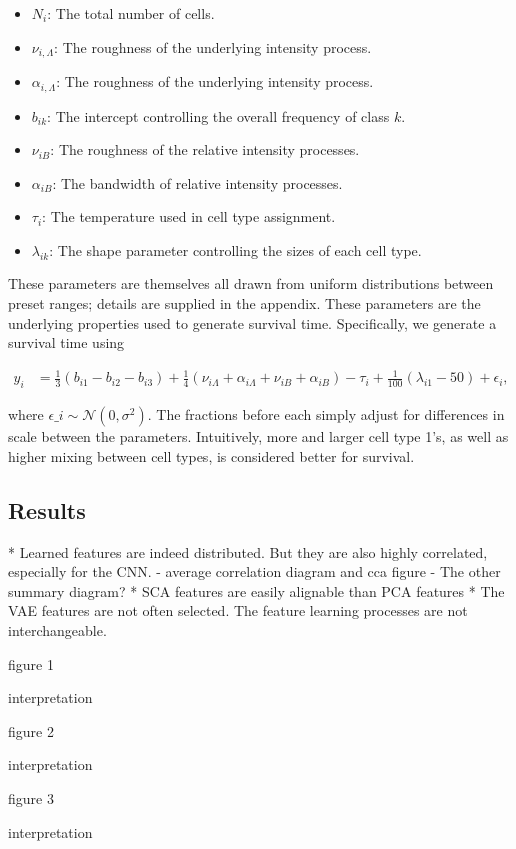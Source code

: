 \begin{itemize}
\item $N_i$: The total number of cells.
\item $\nu_{i,\Lambda}$: The roughness of the underlying intensity process.
\item $\alpha_{i,\Lambda}$: The roughness of the underlying intensity process.
\item $b_{ik}$: The intercept controlling the overall frequency of class $k$.
\item $\nu_{iB}$: The roughness of the relative intensity processes.
\item $\alpha_{iB}$: The bandwidth of relative intensity processes.
\item $\tau_{i}$: The temperature used in cell type assignment.
\item $\lambda_{ik}$: The shape parameter controlling the sizes of each cell type.
\end{itemize}

These parameters are themselves all drawn from uniform distributions between
preset ranges; details are supplied in the appendix. These parameters are the
underlying properties used to generate survival time. Specifically, we generate
a survival time using

\begin{align*}
y_i &= \frac{1}{3}\left(b_{i1} - b_{i2} - b_{i3}\right) + \frac{1}{4}\left(\nu_{i\Lambda} + \alpha_{i\Lambda} + \nu_{iB} + \alpha_{iB}\right) - \tau_{i} + \frac{1}{100}\left(\lambda_{i1} - 50\right) + \epsilon_{i},
\end{align*}

where $\epsilon\_{i} \sim \mathcal{N}\left(0, \sigma^2\right)$. The fractions
before each simply adjust for differences in scale between the parameters.
Intuitively, more and larger cell type 1’s, as well as higher mixing between
cell types, is considered better for survival.

\subsection{Results}

* Learned features are indeed distributed. But they are also highly correlated,
especially for the CNN.
  - average correlation diagram and cca figure
  - The other summary diagram?
* SCA features are easily alignable than PCA features
* The VAE features are not often selected. The feature learning processes are
not interchangeable.

figure 1

interpretation

figure 2

interpretation

figure 3

interpretation
